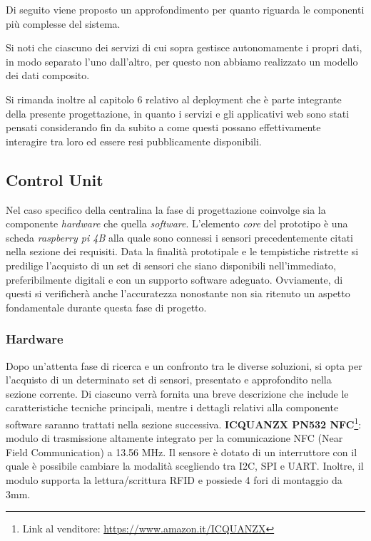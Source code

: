 Di seguito viene proposto un approfondimento per quanto riguarda le componenti più complesse del sistema.

Si noti che ciascuno dei servizi di cui sopra gestisce autonomamente i propri dati, in modo separato l'uno dall'altro, per questo non abbiamo realizzato un modello dei dati composito.

Si rimanda inoltre al capitolo 6 relativo al deployment che è parte integrante della presente progettazione,
in quanto i servizi e gli applicativi web sono stati pensati considerando fin da subito a come questi possano effettivamente 
interagire tra loro ed essere resi pubblicamente disponibili.

\subsection{Control Unit}
Nel caso specifico della centralina la fase di progettazione coinvolge sia la componente \textit{hardware} che quella \textit{software}. L'elemento \textit{core} del prototipo è una scheda \textit{raspberry pi 4B} alla quale sono connessi i sensori precedentemente citati nella sezione dei requisiti. Data la finalità prototipale e le tempistiche ristrette si predilige l'acquisto di un set di sensori che siano disponibili nell'immediato, preferibilmente digitali e con un supporto software adeguato. Ovviamente, di questi si verificherà anche l'accuratezza nonostante non sia ritenuto un aspetto fondamentale durante questa fase di progetto. 

\subsubsection{Hardware}
Dopo un'attenta fase di ricerca e un confronto tra le diverse soluzioni, si opta per l'acquisto di un determinato set di sensori, presentato e approfondito nella sezione corrente. Di ciascuno verrà fornita una breve descrizione che include le caratteristiche tecniche principali, mentre i dettagli relativi alla componente software saranno trattati nella sezione successiva.\newline\newline
%
\textbf{ICQUANZX PN532 NFC}\footnote{Link al venditore: \href{https://www.amazon.it/ICQUANZX-Communication-Arduino-Raspberry-Android/dp/B07VT431QZ/}{https://www.amazon.it/ICQUANZX}}: modulo di trasmissione altamente integrato per la comunicazione NFC (Near Field Communication) a 13.56 MHz. Il sensore è dotato di un interruttore con il quale è possibile cambiare la modalità scegliendo tra I2C, SPI e UART. Inoltre, il modulo supporta la lettura/scrittura RFID e possiede 4 fori di montaggio da 3mm. 
    
